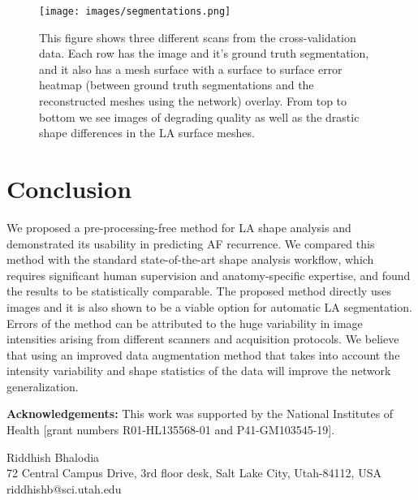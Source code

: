 \documentclass[twocolumn]{cinc}
\begin{document}
\begin{figure}[!h]
	\centering
	\texttt{[image: images/segmentations.png]}
	\vspace{-0.1in}
	\caption{This figure shows three different scans from the cross-validation data. Each row has the image and it's ground truth segmentation, and it also has a mesh surface with a surface to surface error heatmap (between ground truth segmentations and the reconstructed meshes using the network) overlay. From top to bottom we see images of degrading quality as well as the drastic shape differences in the LA surface meshes.}
	\label{fig:hausdaurff}
	\vspace{-0.2in}
\end{figure}

\vspace{-0.1in}
\section{Conclusion}
\vspace{-0.1in}
We proposed a pre-processing-free method for LA shape analysis and demonstrated its usability in predicting AF recurrence. We compared this method with the standard state-of-the-art shape analysis workflow, which requires significant human supervision and anatomy-specific expertise, and found the results to be statistically comparable. The proposed method directly uses images and it is also shown to be a viable option for automatic LA segmentation. Errors of the method can be attributed to the huge variability in image intensities arising from different scanners and acquisition protocols. We believe that using an improved data augmentation method that takes into account the intensity variability and shape statistics of the data will improve the network generalization.

\vspace{0.03in}
\noindent\textbf{Acknowledgements: } This work was supported by the National Institutes of Health [grant numbers R01-HL135568-01 and P41-GM103545-19]. 
\vspace{-0.1in}

\vspace{-0.2in}







\begin{correspondence}
Riddhish Bhalodia\\
72 Central Campus Drive, 3rd floor desk, Salt Lake City, Utah-84112, USA  \\
riddhishb@sci.utah.edu
\end{correspondence}
\end{document}

